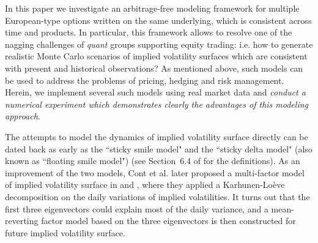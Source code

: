 \documentclass{article}
\numberwithin{equation}{section}
\begin{document}
In this paper we investigate an arbitrage-free modeling framework for multiple European-type options written on the same underlying, which is consistent across time and products. In particular, this framework allows to resolve one of the nagging challenges of \emph{quant} groups supporting equity trading: i.e. how to generate realistic Monte Carlo scenarios of implied volatility surfaces which are consistent with present and historical observations? As mentioned above, such models can be used to address the problems of pricing, hedging and risk management. Herein, we implement several such models using real market data and \emph{conduct a numerical experiment which demonstrates clearly the advantages of this modeling approach}.

The attempts to model the dynamics of implied volatility surface directly can be dated back as early as the ``sticky smile model" and the ``sticky delta model" (also known as ``floating smile model") (see Section~6.4 of \cite{Rebonato2004volatility} for the definitions).  As an improvement of the two models, Cont et al. later proposed a multi-factor model of implied volatility surface in \cite{Cont2002dynamics} and \cite{cont2002stochastic}, where they applied a Karhunen-Lo\`{e}ve decomposition on the daily variations of implied volatilities. It turns out that the first three eigenvectors could explain most of the daily variance, and a mean-reverting factor model based on the three eigenvectors is then constructed for future implied volatility surface.  
\end{document}
